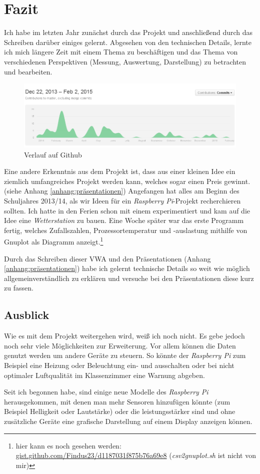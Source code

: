 \chapter{Fazit}
\label{cha:Fazit}
Ich habe im letzten Jahr zunächst durch das Projekt und anschließend durch das Schreiben darüber einiges gelernt. Abgesehen von den technischen Details, lernte ich mich längere Zeit mit einem Thema zu beschäftigen und das Thema von verschiedenen Perspektiven (Messung, Auswertung, Darstellung) zu betrachten und bearbeiten. 
\begin{figure}[h]
  \centering
     \includegraphics[width=\textwidth]{figures/Github_Umweltdatenmessung.png}
  \caption{Verlauf auf \gls{Github}}
  \label{fig:Github}
\end{figure}

Eine andere Erkenntnis aus dem Projekt ist, dass aus einer kleinen Idee ein ziemlich umfangreiches Projekt werden kann, welches sogar einen Preis gewinnt. (siehe Anhang \ref{anhang:präsentationen}) Angefangen hat alles am Beginn des Schuljahres 2013/14, als wir Ideen für ein \emph{Raspberry Pi}-Projekt recherchieren sollten. Ich hatte in den Ferien schon mit einem experimentiert und kam auf die Idee eine \emph{Wetterstation} zu bauen. Eine Woche später war das erste Programm fertig, welches Zufallszahlen, Prozessortemperatur und -auslastung mithilfe von Gnuplot als Diagramm anzeigt.\footnote{hier kann es noch gesehen werden: \href{https://gist.github.com/Findus23/d1187031f875b76a69e8}{gist.github.com/Findus23/d1187031f875b76a69e8} (\emph{csv2gnuplot.sh} ist nicht von mir)}

Durch das Schreiben dieser VWA und den Präsentationen (Anhang \ref{anhang:präsentationen}) 
habe ich gelernt technische Details so weit wie möglich allgemeinverständlich zu erklären und versuche bei den Präsentationen diese kurz zu fassen.

\section{Ausblick}
Wie es mit dem Projekt weitergehen wird, weiß ich noch nicht. Es gebe jedoch noch sehr viele Möglichkeiten zur Erweiterung. Vor allem können die Daten genutzt werden um andere Geräte zu steuern. So könnte der \emph{Raspberry Pi} zum Beispiel eine Heizung oder Beleuchtung ein- und ausschalten oder bei nicht optimaler Luftqualität im Klassenzimmer eine Warnung abgeben. 

Seit ich begonnen habe, sind einige neue Modelle des \emph{Raspberry Pi} herausgekommen, mit denen man mehr Sensoren hinzufügen könnte (zum Beispiel Helligkeit oder Lautstärke) oder die leistungsstärker sind und ohne zusätzliche Geräte eine grafische Darstellung auf einem Display anzeigen können.